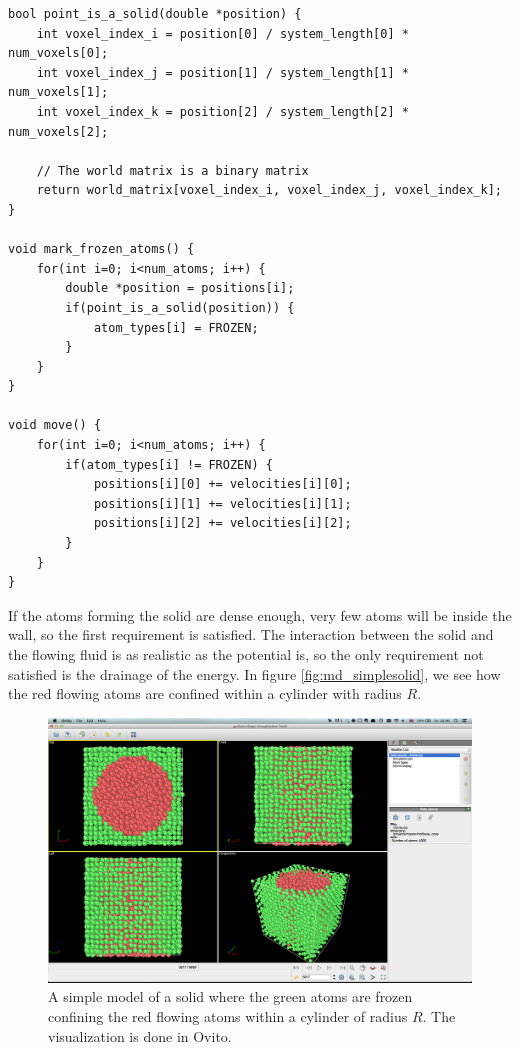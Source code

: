 \begin{lstlisting}[caption=Example code showing how to mark atoms within a solid., label=lst:md_simple_solid]
bool point_is_a_solid(double *position) {
	int voxel_index_i = position[0] / system_length[0] * num_voxels[0];
	int voxel_index_j = position[1] / system_length[1] * num_voxels[1];
	int voxel_index_k = position[2] / system_length[2] * num_voxels[2];

	// The world matrix is a binary matrix
	return world_matrix[voxel_index_i, voxel_index_j, voxel_index_k];
}

void mark_frozen_atoms() {
	for(int i=0; i<num_atoms; i++) {
		double *position = positions[i];
		if(point_is_a_solid(position)) {
			atom_types[i] = FROZEN;
		}
	}
}

void move() {
	for(int i=0; i<num_atoms; i++) {
		if(atom_types[i] != FROZEN) {
			positions[i][0] += velocities[i][0];
			positions[i][1] += velocities[i][1];
			positions[i][2] += velocities[i][2];
		}
	}
}
\end{lstlisting}
If the atoms forming the solid are dense enough, very few atoms will be inside the wall, so the first requirement is satisfied. The interaction between the solid and the flowing fluid is as realistic as the potential is, so the only requirement not satisfied is the drainage of the energy. In figure \ref{fig:md_simplesolid}, we see how the red flowing atoms are confined within a cylinder with radius $R$. 

\begin{figure}[h]
\begin{center}
\includegraphics[width=1.0\textwidth, trim=0cm 0cm 0cm 0cm, clip]{MD/figures/solid_model.png}
\end{center}
\caption{A simple model of a solid where the green atoms are frozen confining the red flowing atoms within a cylinder of radius $R$. The visualization is done in Ovito.}
\label{fig:md_simple_solid}
\end{figure}

